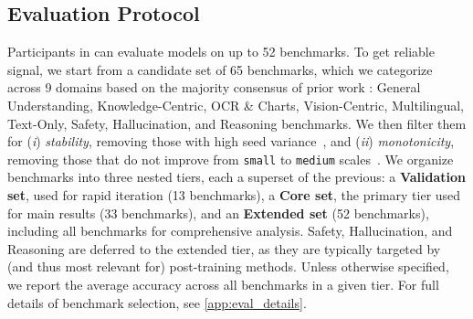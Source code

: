  
 

\subsection{Evaluation Protocol}\label{sec:eval-protocol}
Participants in \dcvlm can evaluate models on up to 52 benchmarks. 
To get reliable signal, we
start from a candidate set of 65 benchmarks, which we categorize across 9 domains based on the majority consensus of prior work \cite{zhu2025internvl3, chen2024expanding, wang2024qwen2,mckinzie2024mm1,tong2024cambrian}: General Understanding, Knowledge-Centric, OCR \& Charts, Vision-Centric, Multilingual, Text-Only, Safety, Hallucination, and Reasoning benchmarks. 
We then filter them for (\textit{i}) \textit{stability}, removing those with high seed variance~\citep{udandarao2025active,madaan2024quantifying}, and (\textit{ii}) \textit{monotonicity}, removing those that do not improve from \texttt{small} to \texttt{medium} scales~\citep{heineman2025signal,penedo2024fineweb}.
We organize benchmarks into three nested tiers, each a superset of the previous: a \textbf{Validation set}, used for rapid iteration (13 benchmarks), a \textbf{Core set}, the primary tier used for main results (33 benchmarks), and an \textbf{Extended set} (52 benchmarks), including all benchmarks for comprehensive analysis. 
Safety, Hallucination, and Reasoning are deferred to the extended tier, as they are typically targeted by (and thus most relevant for) post-training methods. 
Unless otherwise specified, we report the average accuracy across all benchmarks in a given tier. %
For full details of benchmark selection, see \cref{app:eval_details}.









 
 
 





















